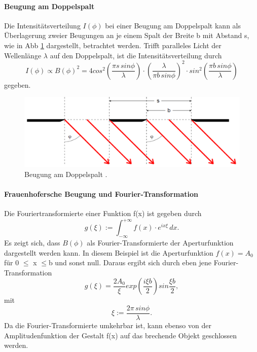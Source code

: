 \paragraph{Beugung am Doppelspalt}
Die Intensitätsverteilung $I(\phi)$ bei einer Beugung am Doppelspalt kann als Überlagerung zweier Beugungen an je 
einem Spalt der Breite b mit Abstand s, wie in Abb \ref{fig:c} dargestellt, betrachtet werden.
Trifft paralleles Licht der Wellenlänge $\lambda$ auf den Doppelspalt, ist die Intensitätsverteilung durch 
\begin{equation}
    \label{eq:7}
    I(\phi) \propto B(\phi)^2 = 4 cos^2\left(\frac{\pi s \, sin \phi}{\lambda}\right) \cdot \left(\frac{\lambda}{\pi b \, sin \phi}\right)^2 \cdot sin^2 \left(\frac{\pi b \, sin \phi}{\lambda}\right)
\end{equation}
gegeben.
\begin{figure}[H]
    \centering
    \includegraphics{Doppelspalt.png}
    \caption{Beugung am Doppelspalt \cite{V406}.}
    \label{fig:c}
\end{figure}

\paragraph{Frauenhofersche Beugung und Fourier-Transformation}
Die Fouriertransformierte einer Funktion f(x) ist gegeben durch
\begin{equation}
    \label{eq:8}
    g(\xi) :=  \int_{- \infty}^{+ \infty} f(x) \cdot e^{ix \xi} \,dx.
\end{equation}
Es zeigt sich, dass $B(\phi)$ als Fourier-Transformierte der Aperturfunktion dargestellt werden kann.
In diesem Beispiel ist die Aperturfunktion $f(x) = A_0$ für 0 $\leq$ x $\leq $b und sonst null.
Daraus ergibt sich durch eben jene Fourier-Transformation
\begin{equation}
    \label{eq:9}
    g(\xi) = \frac{2 A_0}{\xi} exp \left(\frac{i \xi b}{2}\right) sin \frac{\xi b}{2},
\end{equation}
mit
\begin{equation}
    \label{eq:10}
    \xi := \frac{2 \pi \, sin \phi}{\lambda}.
\end{equation}
Da die Fourier-Transformierte umkehrbar ist, kann ebenso von der Amplitudenfunktion der Gestalt f(x) auf das brechende 
Objekt geschlossen werden.

